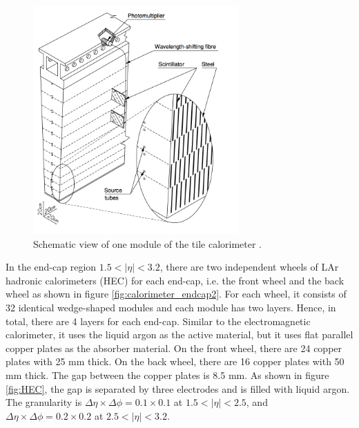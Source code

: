 \begin{figure}
\centering
\includegraphics[width=0.7\textwidth]{data/photo/detector/tile.png}
\caption{Schematic view of one module of the tile calorimeter \cite{ATLAS_doc}.}
\label{fig:tile_calorimeter}
\end{figure}

In the end-cap region $1.5 < |\eta| < 3.2$, there are two independent wheels of LAr hadronic calorimeters (HEC) for each end-cap, i.e. the front wheel and the back wheel as shown in figure \ref{fig:calorimeter_endcap2}.
For each wheel, it consists of 32 identical wedge-shaped modules and each module has two layers.
Hence, in total, there are 4 layers for each end-cap.
Similar to the electromagnetic calorimeter, it uses the liquid argon as the active material, but it uses flat parallel copper plates as the absorber material.
On the front wheel, there are 24 copper plates with 25 mm thick.
On the back wheel, there are 16 copper plates with 50 mm thick.
The gap between the copper plates is 8.5 mm.
As shown in figure \ref{fig:HEC}, the gap is separated by three electrodes and is filled with liquid argon.
The granularity is $\Delta \eta \times \Delta \phi = 0.1 \times 0.1$ at $1.5 < |\eta| < 2.5$, and $\Delta \eta \times \Delta \phi = 0.2 \times 0.2$ at $2.5 < |\eta| < 3.2$.

